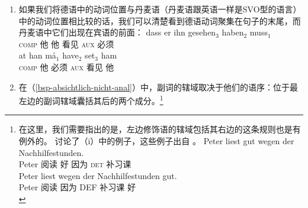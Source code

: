 \begin{enumerate}
\item 如果我们将德语中的动词位置与丹麦语（丹麦语跟英语一样是SVO型的语言）中的动词位置相比较的话，我们可以清楚看到德语动词聚集在句子的末尾，而丹麦语中它们出现在宾语的前面\citep[]{Oersnes2009b}：
\eal
\ex 
\gll dass er ihn gesehen$_3$ haben$_2$ muss$_1$\\
	 \textsc{comp} 他 他 看见 \textsc{aux} 必须\\
\ex 
\gll at han må$_1$ have$_2$ set$_3$ ham\\
     \textsc{comp} 他 必须 \textsc{aux} 看见 他\\
\zl
\item\label{SOV-Skopus} 在（\ref{bsp-absichtlich-nicht-anal}）中，副词的辖域取决于他们的语序：位于最左边的副词辖域囊括其后的两个成分。\footnote{%
在这里，我们需要指出的是，左边修饰语的辖域包括其右边的这条规则也是有例外的。 \citet*[]{Kasper94a}讨论了（i）中的例子，这些例子出自 \citet*[]{BV72}。
\eal
\label{bsp-peter-liest-gut-wegen}
\ex 
\gll Peter liest gut wegen der Nachhilfestunden.\\
	 Peter 阅读 好 因为 \textsc{det} 补习课\\
\ex 
\gll Peter liest wegen der Nachhilfestunden gut.\\
	 Peter 阅读 因为 DEF 补习课 好\\
}
\end{enumerate}
